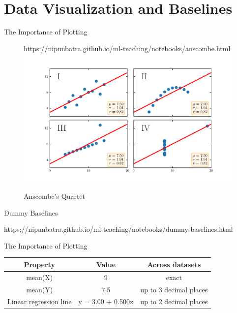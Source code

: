 \documentclass[usenames,dvipsnames]{beamer}
\begin{document}
\section{Data Visualization and Baselines}

\begin{frame}{The Importance of Plotting}
    \begin{figure}[htp]
      \centering
      \begin{notebookbox}{https://nipunbatra.github.io/ml-teaching/notebooks/anscombe.html}
        \includegraphics[width=\linewidth]{../assets/accuracy-convention/figures/anscombe.pdf}
      \end{notebookbox}
      \caption{Anscombe’s Quartet}
    \end{figure}
  \end{frame}

  \begin{frame}{Dummy Baselines}
	\begin{notebookbox}{https://nipunbatra.github.io/ml-teaching/notebooks/dummy-baselines.html}
	  \end{notebookbox}
\end{frame}

\begin{frame}{The Importance of Plotting}
\begin{tabular}{|c|c|c|}
\hline 
Property & Value & Across datasets \\ 
\hline 
mean(X) & 9 & exact \\ 
mean(Y) & 7.5 & up to 3 decimal places \\ 
Linear regression line & 	y = 3.00 + 0.500x & up to 2 decimal places \\ 
\hline 
\end{tabular} 


\end{frame}
\end{document}
